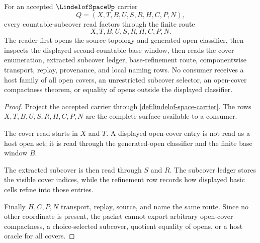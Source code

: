 \begin{theorem}
\label{thm:lindelof-space-countable-cover-route}
For an accepted $\LindelofSpaceUp$ carrier
$$
Q=(X,T,B,U,S,R,H,C,P,N),
$$
every countable-subcover read factors through the finite route
$$
X,T,B,U,S,R,H,C,P,N.
$$
The reader first opens the source topology and generated-open classifier, then inspects the displayed second-countable base window, then reads the cover enumeration, extracted subcover ledger, base-refinement route, componentwise transport, replay, provenance, and local naming rows. No consumer receives a host family of all open covers, an unrestricted subcover selector, an open-cover compactness theorem, or equality of opens outside the displayed classifier.
\end{theorem}
\begin{proof}
Project the accepted carrier through \autoref{def:lindelof-space-carrier}. The rows $X,T,B,U,S,R,H,C,P,N$ are the complete surface available to a consumer.

The cover read starts in $X$ and $T$. A displayed open-cover entry is not read as a host open set; it is read through the generated-open classifier and the finite base window $B$.

The extracted subcover is then read through $S$ and $R$. The subcover ledger stores the visible cover indices, while the refinement row records how displayed basic cells refine into those entries.

Finally $H,C,P,N$ transport, replay, source, and name the same route. Since no other coordinate is present, the packet cannot export arbitrary open-cover compactness, a choice-selected subcover, quotient equality of opens, or a host oracle for all covers.
\end{proof}

